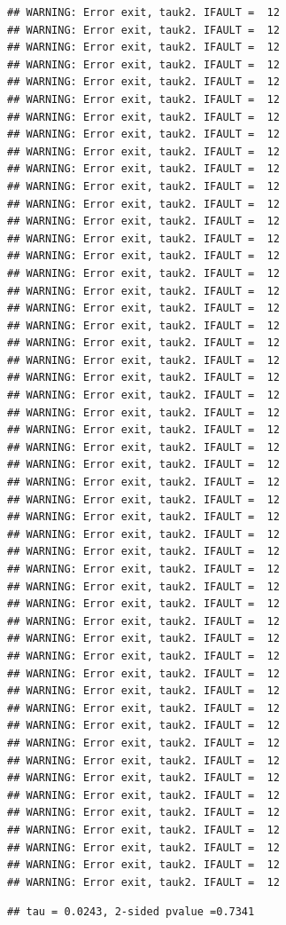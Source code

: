 \documentclass[
  12pt,
]{article}
\newenvironment{Shaded}{\begin{snugshade}}{\end{snugshade}}
\newcommand{\AttributeTok}[1]{\textcolor[rgb]{0.77,0.63,0.00}{#1}}
\newcommand{\CommentTok}[1]{\textcolor[rgb]{0.56,0.35,0.01}{\textit{#1}}}
\newcommand{\DecValTok}[1]{\textcolor[rgb]{0.00,0.00,0.81}{#1}}
\newcommand{\FunctionTok}[1]{\textcolor[rgb]{0.00,0.00,0.00}{#1}}
\newcommand{\NormalTok}[1]{#1}
\newcommand{\OtherTok}[1]{\textcolor[rgb]{0.56,0.35,0.01}{#1}}
\newcommand{\SpecialCharTok}[1]{\textcolor[rgb]{0.00,0.00,0.00}{#1}}
\begin{document}
\begin{verbatim}
## WARNING: Error exit, tauk2. IFAULT =  12
## WARNING: Error exit, tauk2. IFAULT =  12
## WARNING: Error exit, tauk2. IFAULT =  12
## WARNING: Error exit, tauk2. IFAULT =  12
## WARNING: Error exit, tauk2. IFAULT =  12
## WARNING: Error exit, tauk2. IFAULT =  12
## WARNING: Error exit, tauk2. IFAULT =  12
## WARNING: Error exit, tauk2. IFAULT =  12
## WARNING: Error exit, tauk2. IFAULT =  12
## WARNING: Error exit, tauk2. IFAULT =  12
## WARNING: Error exit, tauk2. IFAULT =  12
## WARNING: Error exit, tauk2. IFAULT =  12
## WARNING: Error exit, tauk2. IFAULT =  12
## WARNING: Error exit, tauk2. IFAULT =  12
## WARNING: Error exit, tauk2. IFAULT =  12
## WARNING: Error exit, tauk2. IFAULT =  12
## WARNING: Error exit, tauk2. IFAULT =  12
## WARNING: Error exit, tauk2. IFAULT =  12
## WARNING: Error exit, tauk2. IFAULT =  12
## WARNING: Error exit, tauk2. IFAULT =  12
## WARNING: Error exit, tauk2. IFAULT =  12
## WARNING: Error exit, tauk2. IFAULT =  12
## WARNING: Error exit, tauk2. IFAULT =  12
## WARNING: Error exit, tauk2. IFAULT =  12
## WARNING: Error exit, tauk2. IFAULT =  12
## WARNING: Error exit, tauk2. IFAULT =  12
## WARNING: Error exit, tauk2. IFAULT =  12
## WARNING: Error exit, tauk2. IFAULT =  12
## WARNING: Error exit, tauk2. IFAULT =  12
## WARNING: Error exit, tauk2. IFAULT =  12
## WARNING: Error exit, tauk2. IFAULT =  12
## WARNING: Error exit, tauk2. IFAULT =  12
## WARNING: Error exit, tauk2. IFAULT =  12
## WARNING: Error exit, tauk2. IFAULT =  12
## WARNING: Error exit, tauk2. IFAULT =  12
## WARNING: Error exit, tauk2. IFAULT =  12
## WARNING: Error exit, tauk2. IFAULT =  12
## WARNING: Error exit, tauk2. IFAULT =  12
## WARNING: Error exit, tauk2. IFAULT =  12
## WARNING: Error exit, tauk2. IFAULT =  12
## WARNING: Error exit, tauk2. IFAULT =  12
## WARNING: Error exit, tauk2. IFAULT =  12
## WARNING: Error exit, tauk2. IFAULT =  12
## WARNING: Error exit, tauk2. IFAULT =  12
## WARNING: Error exit, tauk2. IFAULT =  12
## WARNING: Error exit, tauk2. IFAULT =  12
## WARNING: Error exit, tauk2. IFAULT =  12
## WARNING: Error exit, tauk2. IFAULT =  12
## WARNING: Error exit, tauk2. IFAULT =  12
## WARNING: Error exit, tauk2. IFAULT =  12
## WARNING: Error exit, tauk2. IFAULT =  12
\end{verbatim}

\begin{verbatim}
## tau = 0.0243, 2-sided pvalue =0.7341
\end{verbatim}

\begin{Shaded}
\end{Shaded}
\end{document}
